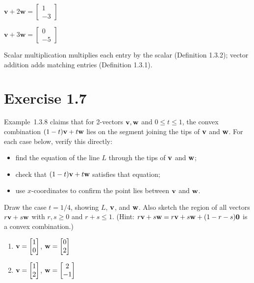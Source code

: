 \begin{solution}
\begin{enumerate}
\begin{answer}
	$\mathbf{v} + 2\mathbf{w} = \begin{bmatrix} 1 \\ -3 \end{bmatrix}$
	
	$\mathbf{v} + 3\mathbf{w} = \begin{bmatrix} 0 \\ -5 \end{bmatrix}$
	\end{answer}
	
	 Scalar multiplication multiplies each entry by the scalar (Definition 1.3.2); vector addition adds matching entries (Definition 1.3.1).
\end{enumerate}
\end{solution}

\section*{Exercise 1.7}
\begin{exercise}
Example~1.3.8 claims that for 2-vectors $\mathbf{v}, \mathbf{w}$ and
$0 \le t \le 1$, the convex combination $(1-t)\mathbf{v} + t\mathbf{w}$ lies on the
segment joining the tips of $\mathbf{v}$ and $\mathbf{w}$. For each case below,
verify this directly:
\begin{itemize}
  \item find the equation of the line $L$ through the tips of $\mathbf{v}$ and $\mathbf{w}$;
  \item check that $(1-t)\mathbf{v} + t\mathbf{w}$ satisfies that equation;
  \item use $x$-coordinates to confirm the point lies between $\mathbf{v}$ and $\mathbf{w}$.
\end{itemize}
Draw the case $t = 1/4$, showing $L$, $\mathbf{v}$, and $\mathbf{w}$. Also sketch the
region of all vectors $r\mathbf{v} + s\mathbf{w}$ with $r, s \ge 0$ and $r + s \le 1$.
(Hint: $r\mathbf{v} + s\mathbf{w} = r\mathbf{v} + s\mathbf{w} + (1-r-s)\mathbf{0}$ is a
convex combination.)
\begin{enumerate}
  \item $\mathbf{v} = \begin{bmatrix} 1 \\ 0 \end{bmatrix}$,
        $\mathbf{w} = \begin{bmatrix} 0 \\ 2 \end{bmatrix}$
  \item $\mathbf{v} = \begin{bmatrix} 1 \\ 2 \end{bmatrix}$,
        $\mathbf{w} = \begin{bmatrix} 2 \\ -1 \end{bmatrix}$
\end{enumerate}
\end{exercise}

